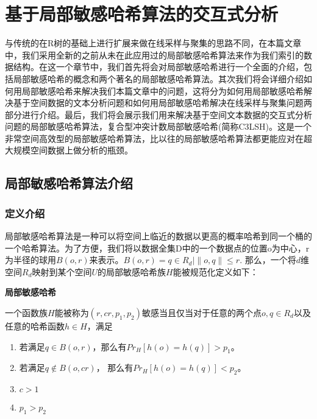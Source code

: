 \chapter{基于局部敏感哈希算法的交互式分析}
\label{cha:china}

与传统的在R树的基础上进行扩展来做在线采样与聚集的思路不同，在本篇文章中，我们采用全新的之前从未在此应用过的局部敏感哈希算法来作为我们索引的数据结构。在这一个章节中，我们首先将会对局部敏感哈希进行一个全面的介绍，包括局部敏感哈希的概念和两个著名的局部敏感哈希算法。其次我们将会详细介绍如何用局部敏感哈希来解决我们本篇文章中的问题，这将分为如何用局部敏感哈希解决基于空间数据的文本分析问题和如何用局部敏感哈希解决在线采样与聚集问题两部分进行介绍。最后，我们将会展示我们用来解决基于空间文本数据的交互式分析问题的局部敏感哈希算法，复合型冲突计数局部敏感哈希(简称C3LSH)。这是一个非常空间高效型的局部敏感哈希算法，比以往的局部敏感哈希算法都更能应对在超大规模空间数据上做分析的瓶颈。

\section{局部敏感哈希算法介绍}
\label{LSHIntro}

\subsection{定义介绍}

局部敏感哈希算法是一种可以将空间上临近的数据以更高的概率哈希到同一个桶的一个哈希算法。为了方便，我们将以数据全集D中的一个数据点的位置o为中心，r为半径的球用$ B(o,r) $来表示。$ B(o,r)={q \in R_d | \parallel o,q \parallel \le r} $. 那么，一个将$ d $维空间$ R_d $映射到某个空间$ U $的局部敏感哈希族$ H $能被规范化定义如下：

\begin{definition}
	
	{\bf 局部敏感哈希}
	
	一个函数族$ H $能被称为$ (r,cr,p_1,p_2) $敏感当且仅当对于任意的两个点$ o,q \in R_d$以及任意的哈希函数$ h \in H $，满足
	
	\begin{enumerate}[(1)]
		
		\item 若满足$ q \in B(o,r) $，那么有$ Pr_H[h(o)=h(q)] > p_1 $。
		
		\item 若满足$ q \notin B(o,cr) $， 那么有$ Pr_H[h(o)=h(q)] < p_2 $。 
		
		\item $ c > 1 $
		
		\item $ p_1 > p_2 $
		
	\end{enumerate}
	
\end{definition}

